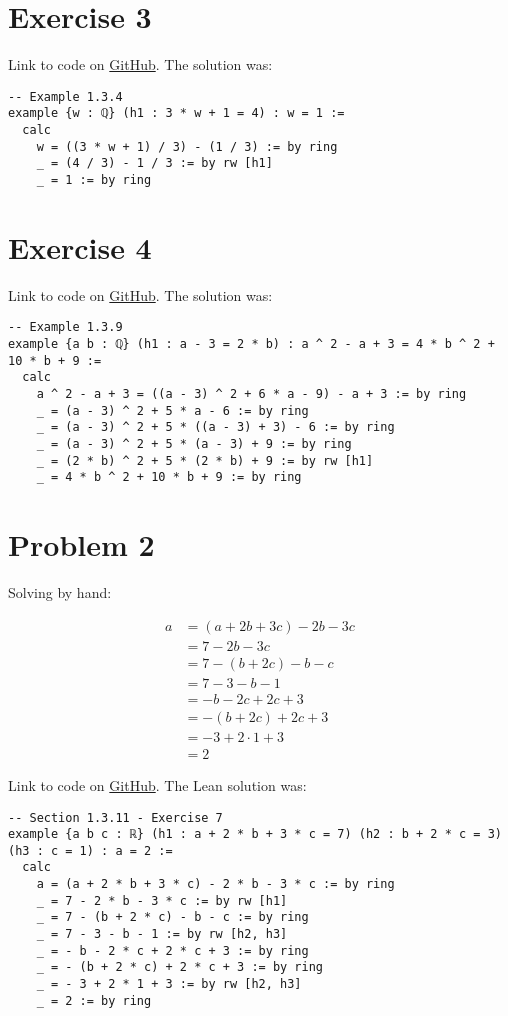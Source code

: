 \documentclass[11pt]{article}
\begin{document}
\section*{Exercise 3}
Link to code on \href{https://github.com/lucastassis/BU-CS511/blob/main/HW01/code/HW01.lean}{GitHub}. The solution was:

\begin{lstlisting}
-- Example 1.3.4
example {w : ℚ} (h1 : 3 * w + 1 = 4) : w = 1 :=
  calc
    w = ((3 * w + 1) / 3) - (1 / 3) := by ring
    _ = (4 / 3) - 1 / 3 := by rw [h1]
    _ = 1 := by ring
\end{lstlisting}

\section*{Exercise 4}
Link to code on \href{https://github.com/lucastassis/BU-CS511/blob/main/HW01/code/HW01.lean}{GitHub}. The solution was: 

\begin{lstlisting}
-- Example 1.3.9
example {a b : ℚ} (h1 : a - 3 = 2 * b) : a ^ 2 - a + 3 = 4 * b ^ 2 + 10 * b + 9 :=
  calc
    a ^ 2 - a + 3 = ((a - 3) ^ 2 + 6 * a - 9) - a + 3 := by ring
    _ = (a - 3) ^ 2 + 5 * a - 6 := by ring
    _ = (a - 3) ^ 2 + 5 * ((a - 3) + 3) - 6 := by ring
    _ = (a - 3) ^ 2 + 5 * (a - 3) + 9 := by ring
    _ = (2 * b) ^ 2 + 5 * (2 * b) + 9 := by rw [h1]
    _ = 4 * b ^ 2 + 10 * b + 9 := by ring
\end{lstlisting}


\section*{Problem 2}
Solving by hand:

\begin{align*}
    a &= (a + 2b + 3c) -2b -3c \\
      &= 7 - 2b - 3c \\
      &= 7 - (b + 2c) - b - c \\
      &= 7 - 3 - b - 1 \\
      &= -b - 2c + 2c + 3 \\
      &= -(b + 2c) + 2c + 3 \\
      &= -3 + 2 \cdot 1 + 3 \\
      &= 2
\end{align*}

Link to code on \href{https://github.com/lucastassis/BU-CS511/blob/main/HW01/code/HW01.lean}{GitHub}. The Lean solution was: 
\begin{lstlisting}
-- Section 1.3.11 - Exercise 7
example {a b c : ℝ} (h1 : a + 2 * b + 3 * c = 7) (h2 : b + 2 * c = 3) (h3 : c = 1) : a = 2 :=
  calc
    a = (a + 2 * b + 3 * c) - 2 * b - 3 * c := by ring
    _ = 7 - 2 * b - 3 * c := by rw [h1]
    _ = 7 - (b + 2 * c) - b - c := by ring
    _ = 7 - 3 - b - 1 := by rw [h2, h3]
    _ = - b - 2 * c + 2 * c + 3 := by ring
    _ = - (b + 2 * c) + 2 * c + 3 := by ring
    _ = - 3 + 2 * 1 + 3 := by rw [h2, h3]
    _ = 2 := by ring
\end{lstlisting}
\end{document}
